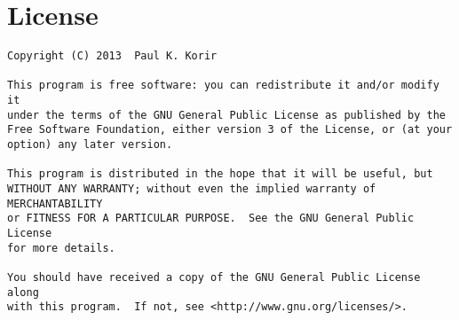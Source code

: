 \documentclass[a4paper,12pt]{article}
\begin{document}
\section{License}
\label{license}
\begin{verbatim}
Copyright (C) 2013  Paul K. Korir 

This program is free software: you can redistribute it and/or modify it
under the terms of the GNU General Public License as published by the 
Free Software Foundation, either version 3 of the License, or (at your
option) any later version.

This program is distributed in the hope that it will be useful, but 
WITHOUT ANY WARRANTY; without even the implied warranty of MERCHANTABILITY
or FITNESS FOR A PARTICULAR PURPOSE.  See the GNU General Public License 
for more details.

You should have received a copy of the GNU General Public License along 
with this program.  If not, see <http://www.gnu.org/licenses/>.
\end{verbatim}
\end{document}
